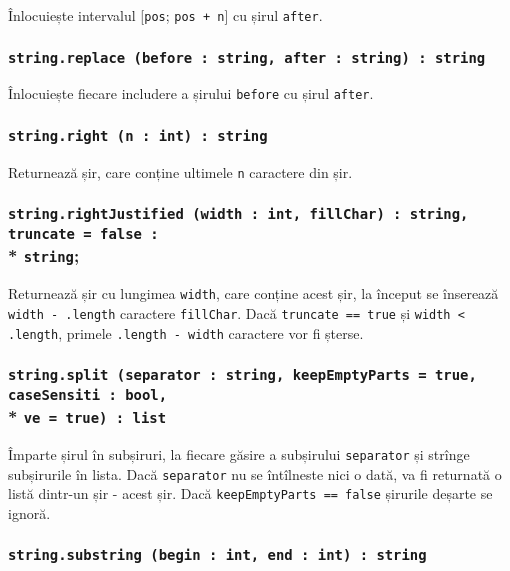Înlocuiește intervalul [\texttt{pos}; \texttt{pos + n}] cu șirul \texttt{after}.

\subsubsection{\texttt{string.replace (before : string, after : string) : string}}

Înlocuiește fiecare includere a șirului \texttt{before} cu șirul \texttt{after}.

\subsubsection{\texttt{string.right (n : int) : string}}

Returnează șir, care conține ultimele \texttt{n} caractere din șir.

\subsubsection{\texttt{string.rightJustified (width : int, fillChar) : string, truncate = false :}\\* \texttt{string};}

Returnează șir cu lungimea \texttt{width}, care conține acest șir, la început se înserează \texttt{width - .length} caractere \texttt{fillChar}. Dacă \texttt{truncate == true} și \texttt{width < .length}, primele \texttt{.length - width} caractere vor fi șterse.

\subsubsection{\texttt{string.split (separator : string, keepEmptyParts = true, caseSensiti : bool,}\\* \texttt{ve = true) : list}}

Împarte șirul în subșiruri, la fiecare găsire a subșirului \texttt{separator} și strînge subșirurile în lista. Dacă \texttt{separator} nu se întîlneste nici o dată, va fi returnată o listă dintr-un șir - acest șir. Dacă \texttt{keepEmptyParts == false} șirurile deșarte se ignoră.

\subsubsection{\texttt{string.substring (begin : int, end : int) : string}}

